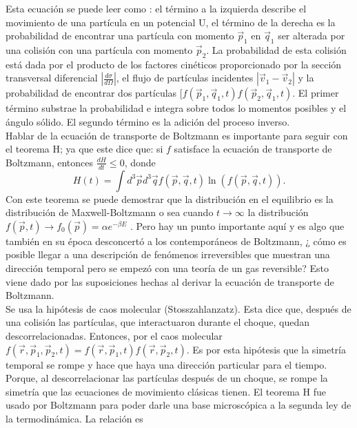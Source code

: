 Esta ecuación se puede leer como \cite{KardarStat}: el término a la izquierda describe el movimiento de una partícula en un potencial U, el término de la derecha es la probabilidad de encontrar una partícula con momento $\vec{p}_{1}$ en $\vec{q}_{1}$ ser alterada por una colisión con una partícula con momento $\vec{p}_{2}$.  La probabilidad de esta colisión está dada por el producto de los factores cinéticos proporcionado por la sección transversal diferencial $ |\frac{d \sigma}{d \Omega}|$, el flujo de partículas incidentes $|\vec{v}_{1}-\vec{v}_{2}|$ y la probabilidad de encontrar dos partículas $[f(\vec{p}_{1},\vec{q}_{1},t)f(\vec{p}_{2},\vec{q}_{1},t)$. El primer término substrae la probabilidad e integra sobre todos lo momentos posibles y el ángulo sólido. El segundo término es la adición del proceso inverso. 
\\
Hablar de la ecuación de transporte de Boltzmann es importante para seguir con el teorema H; ya que este dice que: si $f$ satisface la ecuación de transporte de Boltzmann, entonces $\frac{dH}{dt} \leq 0$, donde 
\begin{equation}
H(t)= \int d^{3} \vec{p} d^{3} \vec{q}  f(\vec{p},\vec{q},t) \ln (f(\vec{p},\vec{q},t)).
\end{equation}
Con este teorema se puede demostrar que la distribución en el equilibrio es la distribución de Maxwell-Boltzmann o sea cuando $t \to \infty$ la distribución  $f(\vec{p},t) \to f_{0}(\vec{p})=  \alpha e^{-\beta E}$ \cite{HuangStat}. Pero hay un punto importante aquí y es algo que también en su época desconcertó a los contemporáneos de Boltzmann, ¿ cómo es posible llegar a una descripción de fenómenos irreversibles que muestran una dirección temporal pero se empezó con una teoría de un gas reversible? Esto viene dado por las suposiciones hechas al derivar la ecuación de transporte de Boltzmann.
\\
Se usa la hipótesis de caos molecular (Stosszahlanzatz). Esta dice que, después de una colisión las partículas, que interactuaron durante el choque, quedan descorrelacionadas. Entonces, por el caos molecular $f(\vec{r},\vec{p}_{1},\vec{p}_{2},t)=f(\vec{r},\vec{p}_{1},t)f(\vec{r},\vec{p}_{2},t)$. Es por esta hipótesis que la simetría temporal se rompe y hace que haya una dirección particular para el tiempo. Porque, al descorrelacionar las partículas después de un choque, se rompe la simetría que las ecuaciones de movimiento clásicas tienen.
El teorema H fue usado por Boltzmann para poder darle una base microscópica a la segunda ley de la termodinámica. La relación es 
